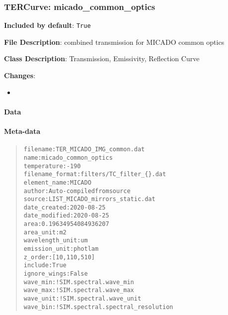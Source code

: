 \subsubsection{TERCurve: \textquotedbl{}micado\_common\_optics\textquotedbl{}%
  \label{tercurve-micado-common-optics}%
}

\textbf{Included by default}: \texttt{True}

\textbf{File Description}: combined transmission for MICADO common optics

\textbf{Class Description}: Transmission, Emissivity, Reflection Curve

\textbf{Changes}:

\begin{itemize}
\item \end{itemize}


\paragraph{Data%
  \label{id1}%
}


\paragraph{Meta-data%
  \label{id2}%
}

\begin{quote}
\begin{alltt}
       filename : TER_MICADO_IMG_common.dat
           name : micado_common_optics
    temperature : -190
filename_format : filters/TC_filter_\{\}.dat
   element_name : MICADO
         author : Auto-compiled from source
         source : LIST_MICADO_mirrors_static.dat
   date_created : 2020-08-25
  date_modified : 2020-08-25
           area : 0.19634954084936207
      area_unit : m2
wavelength_unit : um
  emission_unit : photlam
        z_order : [10, 110, 510]
        include : True
   ignore_wings : False
       wave_min : !SIM.spectral.wave_min
       wave_max : !SIM.spectral.wave_max
      wave_unit : !SIM.spectral.wave_unit
       wave_bin : !SIM.spectral.spectral_resolution
\end{alltt}
\end{quote}

